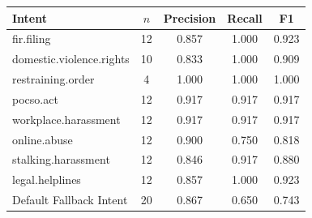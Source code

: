 \begin{tabular}{lcccc}
\hline
Intent & $n$ & Precision & Recall & F1 \\
\hline
fir.filing & 12 & 0.857 & 1.000 & 0.923 \\
domestic.violence.rights & 10 & 0.833 & 1.000 & 0.909 \\
restraining.order & 4 & 1.000 & 1.000 & 1.000 \\
pocso.act & 12 & 0.917 & 0.917 & 0.917 \\
workplace.harassment & 12 & 0.917 & 0.917 & 0.917 \\
online.abuse & 12 & 0.900 & 0.750 & 0.818 \\
stalking.harassment & 12 & 0.846 & 0.917 & 0.880 \\
legal.helplines & 12 & 0.857 & 1.000 & 0.923 \\
Default Fallback Intent & 20 & 0.867 & 0.650 & 0.743 \\
\hline
\end{tabular}
